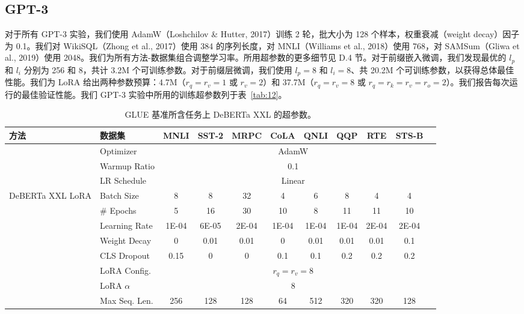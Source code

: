 \documentclass[11pt,UTF8,fontset=fandol]{ctexart}
\begin{document}
\subsection{GPT-3}

对于所有 GPT-3 实验，我们使用 AdamW（Loshchilov \& Hutter, 2017）训练 2 轮，批大小为 128 个样本，权重衰减（weight decay）因子为 0.1。我们对 WikiSQL（Zhong et al., 2017）使用 384 的序列长度，对 MNLI（Williams et al., 2018）使用 768，对 SAMSum（Gliwa et al., 2019）使用 2048。我们为所有方法-数据集组合调整学习率。所用超参数的更多细节见 D.4 节。对于前缀嵌入微调，我们发现最优的 $l_p$ 和 $l_i$ 分别为 256 和 8，共计 3.2M 个可训练参数。对于前缀层微调，我们使用 $l_p=8$ 和 $l_i=8$、共 20.2M 个可训练参数，以获得总体最佳性能。我们为 LoRA 给出两种参数预算：4.7M（$r_q=r_v=1$ 或 $r_v=2$）和 37.7M（$r_q=r_v=8$ 或 $r_q=r_k=r_v=r_o=2$）。我们报告每次运行的最佳验证性能。我们 GPT-3 实验中所用的训练超参数列于表~\ref{tab:12}。

\begin{table}[H]\centering
\caption{GLUE 基准所含任务上 DeBERTa XXL 的超参数。}
\label{tab:10}
\small
\setlength{\tabcolsep}{4pt}
\begin{tabular}{llccccccccc}
\toprule
方法 & 数据集 & MNLI & SST-2 & MRPC & CoLA & QNLI & QQP & RTE & STS-B \\
\midrule
 & Optimizer & \multicolumn{8}{c}{AdamW} \\
 & Warmup Ratio & \multicolumn{8}{c}{0.1} \\
 & LR Schedule & \multicolumn{8}{c}{Linear} \\
\midrule
\multirow{8}{*}{DeBERTa XXL LoRA}
 & Batch Size & 8 & 8 & 32 & 4 & 6 & 8 & 4 & 4 \\
 & \# Epochs & 5 & 16 & 30 & 10 & 8 & 11 & 11 & 10 \\
 & Learning Rate & 1E-04 & 6E-05 & 2E-04 & 1E-04 & 1E-04 & 1E-04 & 2E-04 & 2E-04 \\
 & Weight Decay & 0 & 0.01 & 0.01 & 0 & 0.01 & 0.01 & 0.01 & 0.1 \\
 & CLS Dropout & 0.15 & 0 & 0 & 0.1 & 0.1 & 0.2 & 0.2 & 0.2 \\
 & LoRA Config. & \multicolumn{8}{c}{$r_q=r_v=8$} \\
 & LoRA $\alpha$ & \multicolumn{8}{c}{8} \\
 & Max Seq. Len. & 256 & 128 & 128 & 64 & 512 & 320 & 320 & 128 \\
\bottomrule
\end{tabular}
\end{table}
\end{document}
